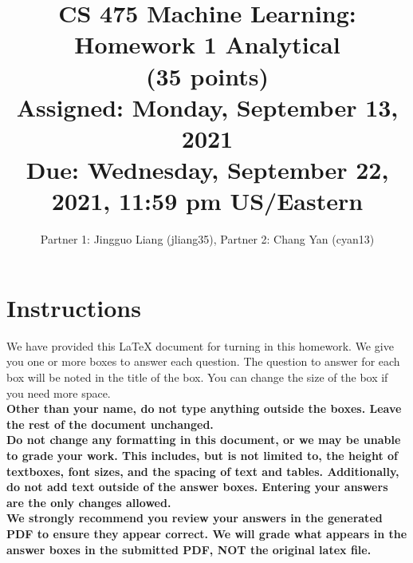 \documentclass[11pt]{article}
\title{CS 475 Machine Learning: Homework 1 Analytical \\
(35 points)\\
\Large{Assigned: Monday, September 13, 2021} \\
\Large{Due: Wednesday, September 22, 2021, 11:59 pm US/Eastern}}
\author{Partner 1: Jingguo Liang (jliang35), Partner 2:  Chang Yan (cyan13)}
\date{}
\renewcommand{\vec}[1]{\mathbf{#1}}
\begin{document}
\maketitle
\thispagestyle{headings}

\section*{Instructions }
We have provided this \LaTeX{} document for turning in this homework. We give you one or more boxes to answer each question.  The question to answer for each box will be noted in the title of the box.  You can change the size of the box if you need more space.\\

{\bf Other than your name, do not type anything outside the boxes. Leave the rest of the document unchanged.}\\


\textbf{Do not change any formatting in this document, or we may be unable to
  grade your work. This includes, but is not limited to, the height of
  textboxes, font sizes, and the spacing of text and tables.  Additionally, do
  not add text outside of the answer boxes. Entering your answers are the only
  changes allowed.}\\


\textbf{We strongly recommend you review your answers in the generated PDF to
  ensure they appear correct. We will grade what appears in the answer boxes in
  the submitted PDF, NOT the original latex file.}

\end{document}
